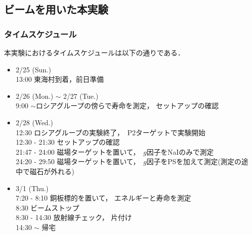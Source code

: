 \subsection{ビームを用いた本実験}
\subsubsection{タイムスケジュール}
本実験におけるタイムスケジュールは以下の通りである．
\begin{itemize}
\item 2/25 (Sun.)\\
  13:00   東海村到着，前日準備
\item 2/26 (Mon.) $\sim$ 2/27 (Tue.)\\
  9:00 $\sim$ロシアグループの傍らで寿命を測定， セットアップの確認
\item 2/28 (Wed.)\\
  12:30   ロシアグループの実験終了，\ P2ターゲットで実験開始\\
  12:30 - 21:30 セットアップの確認\\
  21:47 - 24:00 磁場ターゲットを置いて，\ $g$因子をNaIのみで測定\\
  24:20 - 29:50 磁場ターゲットを置いて，\ $g$因子をPSを加えて測定(測定の途中で磁石が外れる)
\item 3/1 (Thu.)\\
  7:20 - 8:10 銅板標的を置いて， エネルギーと寿命を測定\\
  8:30   ビームストップ\\
  8:30 - 14:30 放射線チェック， 片付け \\
  14:30 $\sim$ 帰宅
\end{itemize}
